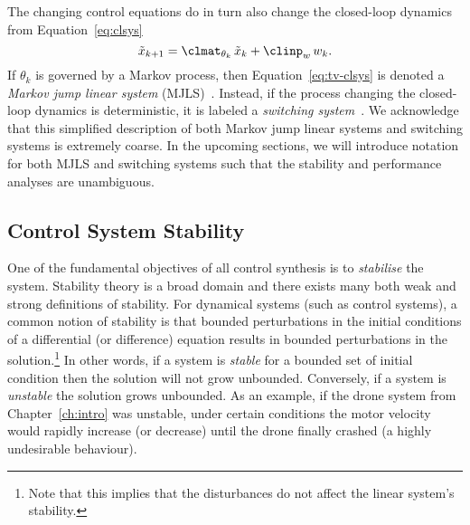 The changing control equations do in turn also change the closed-loop dynamics from Equation~\eqref{eq:clsys}
%
\begin{equation}%
    \label{eq:tv-clsys}%
    \tilde{x}_{k+1} = \clmat_{\theta_k}\, \tilde{x}_k + \clinp_w\, w_k.
\end{equation}
%
If $\theta_k$ is governed by a Markov process, then Equation~\eqref{eq:tv-clsys} is denoted a \emph{Markov jump linear system} (MJLS)~\cite{Feng:1992}.
Instead, if the process changing the closed-loop dynamics is deterministic, it is labeled a \emph{switching system}~\cite{Liberzon:2003}.
We acknowledge that this simplified description of both Markov jump linear systems and switching systems is extremely coarse.
In the upcoming sections, we will introduce notation for both MJLS and switching systems such that the stability and performance analyses are unambiguous.



\subsection{Control System Stability}%
\label{sec:background:stability}%
%
One of the fundamental objectives of all control synthesis is to \emph{stabilise} the system.
Stability theory is a broad domain and there exists many both weak and strong definitions of stability.
For dynamical systems (such as control systems), a common notion of stability is that bounded perturbations in the initial conditions of a differential (or difference) equation results in bounded perturbations in the solution.\footnote{Note that this implies that the disturbances do not affect the linear system's stability.}
In other words, if a system is \emph{stable} for a bounded set of initial condition then the solution will not grow unbounded.
Conversely, if a system is \emph{unstable} the solution grows unbounded.
As an example, if the drone system from Chapter~\ref{ch:intro} was unstable, under certain conditions the motor velocity would rapidly increase (or decrease) until the drone finally crashed (a highly undesirable behaviour).

